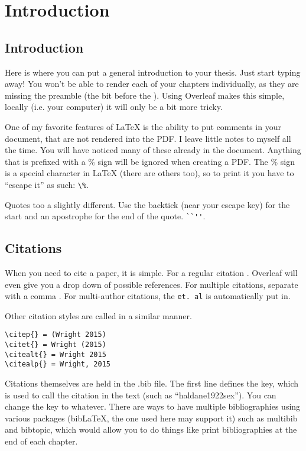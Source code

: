 
\chapter{Introduction} %

\label{Introduction} %

\section{Introduction}

Here is where you can put a general introduction to your thesis. Just start typing away! You won't be able to render each of your chapters individually, as they are missing the preamble (the bit before the \verb++). Using Overleaf makes this simple, locally (i.e. your computer) it will only be a bit more tricky. 

One of my favorite features of \LaTeX{} is the ability to put comments in your document, that are not rendered into the PDF. I leave little notes to myself all the time. You will have noticed many of these already in the document. Anything that is prefixed with a \% sign will be ignored when creating a PDF. The \% sign is a special character in \LaTeX{} (there are others too), so to print it you have to ``escape it'' as such: \verb+\%+.

Quotes too a slightly different. Use the backtick (near your escape key) for the start and an apostrophe for the end of the quote. \verb+``''+. 

\section{Citations}
When you need to cite a paper, it is simple. For a regular citation \citep{wright1932roles}. Overleaf will even give you a drop down of possible references. For multiple citations, separate with a comma \citep{wright1932roles,haldane1922sex}. For multi-author citations, the \verb+et. al+ is automatically put in.



Other citation styles are called in a similar manner.
\begin{verbatim}
\citep{} = (Wright 2015)
\citet{} = Wright (2015)
\citealt{} = Wright 2015
\citealp{} = Wright, 2015
\end{verbatim}

Citations themselves are held in the .bib file. The first line defines the key, which is used to call the citation in the text (such as ``haldane1922sex''). You can change the key to whatever. There are ways to have multiple bibliographies using various packages (bib\LaTeX{}, the one used here may support it) such as multibib and bibtopic, which would allow you to do things like print bibliographies at the end of each chapter. 

